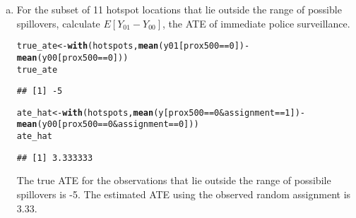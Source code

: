 \documentclass[11pt,notitlepage]{article}\usepackage[]{graphicx}\usepackage[]{color}
\makeatletter
\newcommand{\hlnum}[1]{\textcolor[rgb]{0.686,0.059,0.569}{#1}}%
\newcommand{\hlopt}[1]{\textcolor[rgb]{0,0,0}{#1}}%
\newcommand{\hlstd}[1]{\textcolor[rgb]{0.345,0.345,0.345}{#1}}%
\newcommand{\hlkwb}[1]{\textcolor[rgb]{0.69,0.353,0.396}{#1}}%
\newcommand{\hlkwd}[1]{\textcolor[rgb]{0.737,0.353,0.396}{\textbf{#1}}}%
\newenvironment{kframe}{%
 \def\at@end@of@kframe{}%
 \ifinner\ifhmode%
  \def\at@end@of@kframe{\end{minipage}}%
  \begin{minipage}{\columnwidth}%
 \fi\fi%
 \def\FrameCommand##1{\hskip\@totalleftmargin \hskip-\fboxsep
 \colorbox{shadecolor}{##1}\hskip-\fboxsep
     \hskip-\linewidth \hskip-\@totalleftmargin \hskip\columnwidth}%
 \MakeFramed {\advance\hsize-\width
   \@totalleftmargin\z@ \linewidth\hsize
   \@setminipage}}%
 {\par\unskip\endMakeFramed%
 \at@end@of@kframe}
\newenvironment{knitrout}{}{} %
\makeatother
\begin{document}
\begin{enumerate}[a)]
\item For the subset of 11 hotspot locations that lie outside the range of possible spillovers, calculate $E[Y_{01} - Y_{00}]$, the ATE of immediate police surveillance.
\begin{knitrout}
\color{fgcolor}\begin{kframe}
\begin{alltt}
\hlstd{true_ate} \hlkwb{<-} \hlkwd{with}\hlstd{(hotspots,} \hlkwd{mean}\hlstd{(y01[prox500}\hlopt{==}\hlnum{0}\hlstd{])} \hlopt{-} \hlkwd{mean}\hlstd{(y00[prox500}\hlopt{==}\hlnum{0}\hlstd{]))}
\hlstd{true_ate}
\end{alltt}
\begin{verbatim}
## [1] -5
\end{verbatim}
\begin{alltt}
\hlstd{ate_hat} \hlkwb{<-} \hlkwd{with}\hlstd{(hotspots,} \hlkwd{mean}\hlstd{(y[prox500}\hlopt{==}\hlnum{0} \hlopt{&} \hlstd{assignment}\hlopt{==}\hlnum{1}\hlstd{])} \hlopt{-}
                  \hlkwd{mean}\hlstd{(y00[prox500}\hlopt{==}\hlnum{0} \hlopt{&} \hlstd{assignment}\hlopt{==}\hlnum{0}\hlstd{]))}
\hlstd{ate_hat}
\end{alltt}
\begin{verbatim}
## [1] 3.333333
\end{verbatim}
\end{kframe}
\end{knitrout}
The true ATE for the observations that lie outside the range of possibile spillovers is -5. The estimated ATE using the observed random assignment is 3.33.


\end{enumerate}
\end{document}

